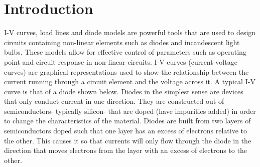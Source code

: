 \documentclass[12pt]{article}
\begin{document}
\section{Introduction}
%
I-V curves, load lines and diode models are powerful tools that are used to design circuits containing non-linear elements such as diodes and incandescent light bulbs. These models allow for effective control of parameters such as operating point and circuit response in non-linear circuits. I-V curves (current-voltage curves) are graphical representations used to show the relationship between the current running through a circuit element and the voltage across it. A typical I-V curve is that of a diode shown below. Diodes in the simplest sense are devices that only conduct current in one direction. They are constructed out of semiconductors- typically silicon- that are doped (have impurities added) in order to change the characteristics of the material. Diodes are built from two layers of semiconductors doped such that one layer has an excess of electrons relative to the other. This causes it so that currents will only flow through the diode in the direction that moves electrons from the layer with an excess of electrons to the other. \par 

\begin {figure}[htb!]
 \begin{center}
   \resizebox{0.6\textwidth}{!}{}
 \end{center}
\end {figure}
\end{document}
